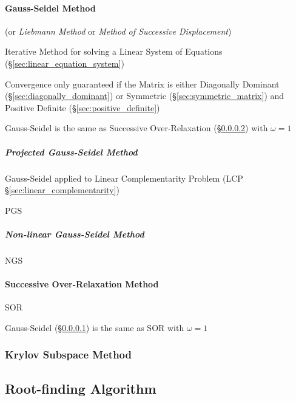 {\paragraph{Gauss-Seidel Method}\label{sec:gauss_seidel}\hfill

(or \emph{Liebmann Method} or \emph{Method of Successive
  Displacement})

Iterative Method for solving a Linear System of Equations
(\S\ref{sec:linear_equation_system})

Convergence only guaranteed if the Matrix is either Diagonally
Dominant (\S\ref{sec:diagonally_dominant}) or Symmetric
(\S\ref{sec:symmetric_matrix}) and Positive Definite
(\S\ref{sec:positive_definite})

Gauss-Seidel is the same as Successive Over-Relaxation
(\S\ref{sec:successive_over_relaxation}) with $\omega = 1$



\subparagraph{Projected Gauss-Seidel Method}\hfill
\label{sec:projected_gauss_seidel}

Gauss-Seidel applied to Linear Complementarity Problem (LCP
\S\ref{sec:linear_complementarity})

PGS



\subparagraph{Non-linear Gauss-Seidel Method}
\label{sec:nonlinear_gauss_seidel}

NGS



\paragraph{Successive Over-Relaxation Method}
\label{sec:successive_over_relaxation}\hfill

SOR

Gauss-Seidel (\S\ref{sec:gauss_seidel}) is the same as SOR with $\omega = 1$



\subsubsection{Krylov Subspace Method}\label{sec:krylov_subspace_method}



\subsection{Root-finding Algorithm}\label{sec:root_finding}

}

